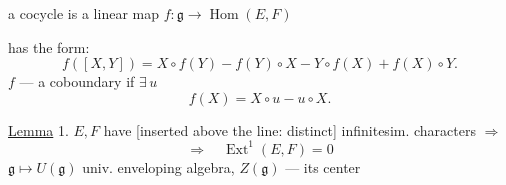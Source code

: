 a cocycle is a linear map \(f:\mathfrak g\longrightarrow\operatorname{Hom}(E,F)\)

 has the form:
\begin{equation*}
f([X,Y])=X\circ f(Y)-f(Y)\circ X-Y\circ f(X)+f(X)\circ Y.
\tag{4}
\end{equation*}
\(f\) --- a coboundary if \(\exists\,u\)
\begin{equation*}
f(X)=X\circ u-u\circ X.
\tag{5}
\end{equation*}

\underline{Lemma} 1. \(E,F\) have [inserted above the line: distinct]
infinitesim. characters \(\Rightarrow\)
\[
\Rightarrow\quad\operatorname{Ext}^1(E,F)=0
\]
\(\mathfrak g\longmapsto U(\mathfrak g)\)\qquad
univ. enveloping algebra, \(Z(\mathfrak g)\) --- its center


